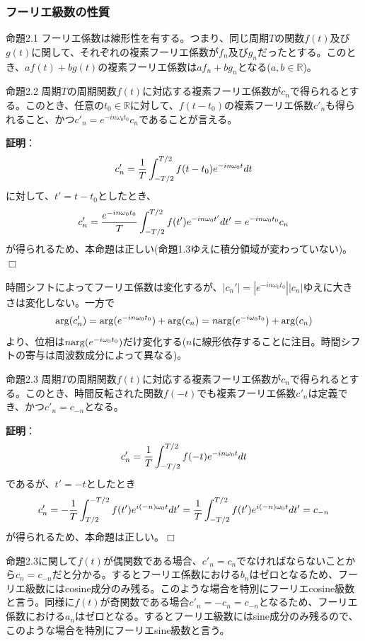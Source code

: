 \documentclass[dvipdfmx, 9pt, a4paper]{jsarticle}
\def\qed{\hfill $\Box$}
\begin{document}
\subsubsection{フーリエ級数の性質}
\begin{itembox}[l]{命題2.1}
フーリエ係数は線形性を有する。つまり、同じ周期$T$の関数$f(t)$及び$g(t)$に関して、それぞれの複素フーリエ係数が$f_n$及び$g_n$だったとする。このとき、$af(t)+bg(t)$の複素フーリエ係数は$af_n+bg_n$となる($a,b \in \mathbb{R}$)。
\end{itembox}
\begin{itembox}[l]{命題2.2}
周期$T$の周期関数$f(t)$に対応する複素フーリエ係数が$c_n$で得られるとする。このとき、任意の$t_0 \in \mathbb{R}$に対して、$f(t-t_0)$の複素フーリエ係数$c'_n$も得られること、かつ$c'_n=e^{-in\omega_0t_0}c_n$であることが言える。
\end{itembox}
{\bf 証明}：
\begin{equation}
c'_n=\frac{1}{T}\int_{-T/2}^{T/2}f(t-t_0)e^{-in\omega_0t}dt \notag
\end{equation}
に対して、$t'=t-t_0$としたとき、
\begin{equation}
c'_n=\frac{e^{-in\omega_0t_0}}{T}\int_{-T/2}^{T/2}f(t')e^{-in\omega_0t'}dt'=e^{-in\omega_0t_0}c_n \notag
\end{equation}
が得られるため、本命題は正しい(命題1.3ゆえに積分領域が変わっていない)。\qed \par
時間シフトによってフーリエ係数は変化するが、$|c_n'|=|e^{-in\omega_0t_0}||c_n|$ゆえに大きさは変化しない。一方で
\begin{equation}
{\rm arg}(c_n')={\rm arg}(e^{-in\omega_0t_0})+{\rm arg}(c_n)=n{\rm arg}(e^{-i\omega_0t_0})+{\rm arg}(c_n) \notag
\end{equation}
より、位相は$n{\rm arg}(e^{-i\omega_0t_0})$だけ変化する($n$に線形依存することに注目。時間シフトの寄与は周波数成分によって異なる)。
\begin{itembox}[l]{命題2.3}
周期$T$の周期関数$f(t)$に対応する複素フーリエ係数が$c_n$で得られるとする。このとき、時間反転された関数$f(-t)$でも複素フーリエ係数$c'_n$は定義でき、かつ$c'_n=c_{-n}$となる。
\end{itembox}
{\bf 証明}：
\begin{equation}
c'_n=\frac{1}{T}\int_{-T/2}^{T/2}f(-t)e^{-in\omega_0t}dt \notag
\end{equation}
であるが、$t'=-t$としたとき
\begin{equation}
c_n'=-\frac{1}{T}\int_{T/2}^{-T/2}f(t')e^{i(-n)\omega_0t}dt'=\frac{1}{T}\int_{-T/2}^{T/2}f(t')e^{i(-n)\omega_0t}dt'=c_{-n} \notag
\end{equation}
が得られるため、本命題は正しい。\qed \par
命題2.3に関して$f(t)$が偶関数である場合、$c'_n=c_n$でなければならないことから$c_n=c_{-n}$だと分かる。するとフーリエ係数における$b_n$はゼロとなるため、フーリエ級数にはcosine成分のみ残る。このような場合を特別にフーリエcosine級数と言う。同様に$f(t)$が奇関数である場合$c'_n=-c_n=c_{-n}$となるため、フーリエ係数における$a_n$はゼロとなる。するとフーリエ級数にはsine成分のみ残るので、このような場合を特別にフーリエsine級数と言う。
\end{document}

